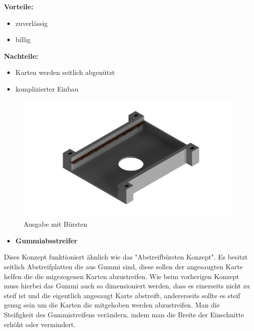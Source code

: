 \textbf{Vorteile:}
\begin{itemize}
    \item zuverlässig
    \item billig
\end{itemize}
\textbf{Nachteile:}
\begin{itemize}
    \item Karten werden seitlich abgenützt
    \item komplizierter Einbau
\end{itemize}

\begin{figure}[H]
    \centering
    \includegraphics[scale=0.5,page=1]{fig/mech/AusgabeMitBuersten}
    \caption{Ausgabe mit Bürsten}
\end{figure}

\begin{itemize}
    \item \textbf{Gummiabsstreifer}
\end{itemize}

Dises Konzept funktioniert ähnlich wie das "Abstreifbürsten Konzept". Es besitzt seitlich Abstreifplatten die aus Gummi sind, diese
sollen der angesaugten Karte helfen die die migezogenen Karten abzustreifen. Wie beim vorherigen Konzept muss hierbei das Gummi auch so
dimensioniert werden, dass es einerseits nicht zu steif ist und die eigentlich angesaugt Karte abstreift, andererseits sollte es steif genug
sein um die Karten die mitgehoben werden abzustreifen. Man die Steifigkeit des Gummistreifens verändern, indem man die Breite der Einschnitte
erhöht oder vermindert.


